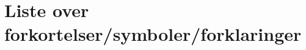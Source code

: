\documentclass[12pt, norsk]{article}
\begin{document}

\begin{titlepage}      %

\end{titlepage}

\pagestyle{fancy}       %
\renewcommand{\headrulewidth}{0pt}   %
\fancyhead{}            %
\fancyfoot{}
\fancyfoot[R]{\thepage} %
\normalfont             %
\setlength\parindent{0pt}  %

\newpage

\newpage

\tableofcontents %
\section*{Liste over forkortelser/symboler/forklaringer}
\listoffigures   %
\listoftables    %
\newpage

\setcounter{page}{1}   %




\newpage




\newpage




\newpage


\newpage


\newpage


\newpage



\printbibliography
\newpage

\setcounter{page}{1}  %
\appendix

\end{document}
